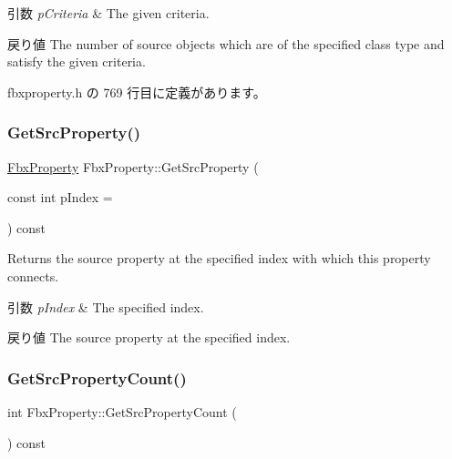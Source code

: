 \begin{DoxyParams}{引数}
{\em p\+Criteria} & The given criteria. \\
\hline
\end{DoxyParams}
\begin{DoxyReturn}{戻り値}
The number of source objects which are of the specified class type and satisfy the given criteria. 
\end{DoxyReturn}


 fbxproperty.\+h の 769 行目に定義があります。

\mbox{\label{class_fbx_property_ad538b18849614ac8d6ec3031bdf8a7ea}} 
\subsubsection{\texorpdfstring{Get\+Src\+Property()}{GetSrcProperty()}}
{\footnotesize\ttfamily \hyperlink{class_fbx_property}{Fbx\+Property} Fbx\+Property\+::\+Get\+Src\+Property (\begin{DoxyParamCaption}\item[{const int}]{p\+Index = {} }\end{DoxyParamCaption}) const}

Returns the source property at the specified index with which this property connects. 
\begin{DoxyParams}{引数}
{\em p\+Index} & The specified index. \\
\hline
\end{DoxyParams}
\begin{DoxyReturn}{戻り値}
The source property at the specified index. 
\end{DoxyReturn}
\mbox{\label{class_fbx_property_a536aec7568f10441cf70045aa8842429}} 
\subsubsection{\texorpdfstring{Get\+Src\+Property\+Count()}{GetSrcPropertyCount()}}
{\footnotesize\ttfamily int Fbx\+Property\+::\+Get\+Src\+Property\+Count (\begin{DoxyParamCaption}{ }\end{DoxyParamCaption}) const}

